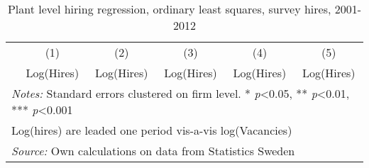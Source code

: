 \begin{table}[htbp]\centering
\def\sym#1{\ifmmode^{#1}\else\(^{#1}\)\fi}
\caption{Plant level hiring regression, ordinary least squares, survey hires, 2001-2012}
\begin{tabular}{l*{5}{c}}
\hline\hline
                &\multicolumn{1}{c}{(1)}&\multicolumn{1}{c}{(2)}&\multicolumn{1}{c}{(3)}&\multicolumn{1}{c}{(4)}&\multicolumn{1}{c}{(5)}\\
                &\multicolumn{1}{c}{Log(Hires)}&\multicolumn{1}{c}{Log(Hires)}&\multicolumn{1}{c}{Log(Hires)}&\multicolumn{1}{c}{Log(Hires)}&\multicolumn{1}{c}{Log(Hires)}\\
\hline


\hline 


\hline\hline
\multicolumn{6}{l}{\footnotesize \emph{Notes:} Standard errors clustered on firm level. * \emph{p}<0.05, ** \emph{p}<0.01, *** \emph{p}<0.001}\\
\multicolumn{6}{l}{\footnotesize Log(hires) are leaded one period vis-a-vis log(Vacancies)}\\
\multicolumn{6}{l}{\footnotesize \emph{Source:} Own calculations on data from Statistics Sweden}\\
\end{tabular}
\end{table}